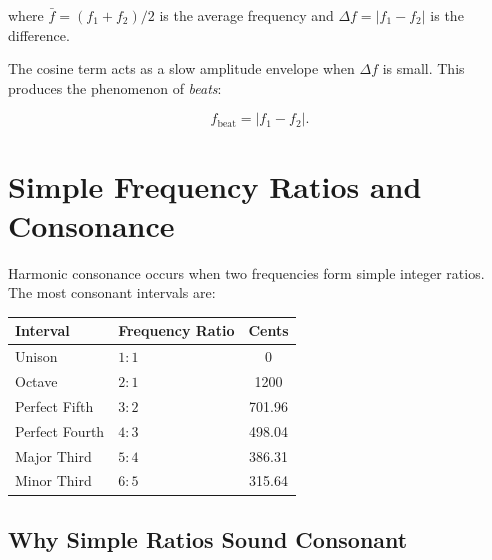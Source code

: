 \documentclass[11pt]{article}
\theoremstyle{definition}
\begin{document}
where $\bar{f} = (f_1 + f_2)/2$ is the average frequency and $\Delta f = |f_1 - f_2|$ is the difference.

The cosine term acts as a slow amplitude envelope when $\Delta f$ is small. This produces the phenomenon of \emph{beats}:

\begin{equation}
    f_{\text{beat}} = |f_1 - f_2|.
    \label{eq:beats}
\end{equation}

\begin{center}
\end{center}

\section{Simple Frequency Ratios and Consonance}

Harmonic consonance occurs when two frequencies form simple integer ratios. The most consonant intervals are:

\begin{center}
\begin{tabular}{llc}
\toprule
Interval & Frequency Ratio & Cents \\
\midrule
Unison & $1:1$ & 0 \\
Octave & $2:1$ & 1200 \\
Perfect Fifth & $3:2$ & 701.96 \\
Perfect Fourth & $4:3$ & 498.04 \\
Major Third & $5:4$ & 386.31 \\
Minor Third & $6:5$ & 315.64 \\
\bottomrule
\end{tabular}
\end{center}

\subsection{Why Simple Ratios Sound Consonant}
\end{document}
